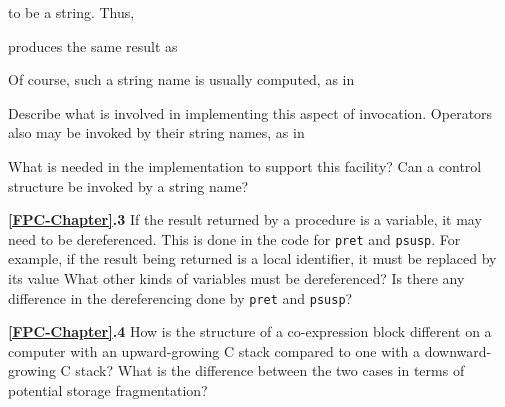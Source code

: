 
\noindent to be a string. Thus,


\noindent produces the same result as


Of course, such a string name is usually computed, as in


Describe what is involved in implementing this aspect of
invocation. Operators also may be invoked by their string names, as in


What is needed in the implementation to support this facility? Can a
control structure be invoked by a string name?

\textbf{\ref*{FPC-Chapter}.3}
If the result returned by a procedure is a variable, it
may need to be dereferenced. This is done in the code for
\texttt{pret} and \texttt{psusp}. For example, if the result being
returned is a local identifier, it must be replaced by its value What
other kinds of variables must be dereferenced? Is there any difference
in the dereferencing done by \texttt{pret} and \texttt{psusp}?

\textbf{\ref*{FPC-Chapter}.4}
How is the structure of a co-expression block different
on a computer with an upward-growing C stack compared to one with a
downward-growing C stack? What is the difference between the two cases
in terms of potential storage fragmentation?
